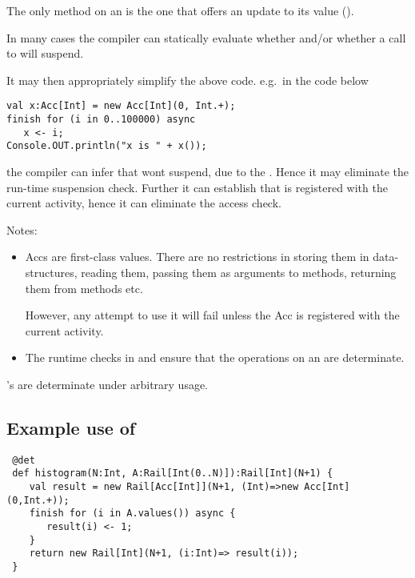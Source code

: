 The only  method on an  is the one that offers an
update to its value ().

In many cases the compiler can statically evaluate whether
 and/or whether a call to 
  will suspend. 

It may then appropriately simplify the above code. e.g.{}~in the code below
\begin{lstlisting}
val x:Acc[Int] = new Acc[Int](0, Int.+);
finish for (i in 0..100000) async
   x <- i;
Console.OUT.println("x is " + x());  
\end{lstlisting}
\noindent the compiler can infer that  wont suspend, due to
the . Hence it may eliminate the run-time suspension
check. Further it can establish that  is 
registered with the current activity, hence it can eliminate the
access check. 

Notes:
\begin{itemize}
\item 
   Accs are first-class values. There are no restrictions in storing
   them in data-structures, reading them, passing them as arguments to
   methods, returning them from methods etc. 

   However, any attempt to use it will fail unless the Acc is
   registered with the current activity.

\item The runtime checks in  and
    ensure that the operations on an 
  are determinate.

\end{itemize}

\begin{proposition}
's are determinate under arbitrary usage.   
\end{proposition}

\subsection{Example use of }
\begin{example}[Histogram]
\begin{lstlisting}
 @det
 def histogram(N:Int, A:Rail[Int(0..N)]):Rail[Int](N+1) {
    val result = new Rail[Acc[Int]](N+1, (Int)=>new Acc[Int](0,Int.+));
    finish for (i in A.values()) async {
       result(i) <- 1;
    }
    return new Rail[Int](N+1, (i:Int)=> result(i));
 }
\end{lstlisting}
\end{example}

